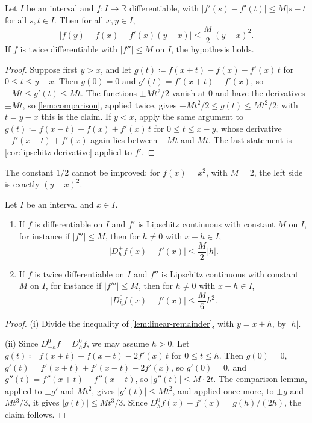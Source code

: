 \begin{lemma}
\label{lem:linear-remainder}
Let $I$ be an interval and $f\colon I\to\mathbb R$ differentiable, with $|f'(s)-f'(t)|\le M|s-t|$ for all $s,t\in I$. Then for all $x,y\in I$,
\[
\bigl|f(y)-f(x)-f'(x)(y-x)\bigr|\le\frac M2\,(y-x)^2 .
\]
If $f$ is twice differentiable with $|f''|\le M$ on $I$, the hypothesis holds.
\end{lemma}

\begin{proof}
Suppose first $y>x$, and let $g(t)\coloneqq f(x+t)-f(x)-f'(x)\,t$ for $0\le t\le y-x$. Then $g(0)=0$ and $g'(t)=f'(x+t)-f'(x)$, so $-Mt\le g'(t)\le Mt$. The functions $\pm Mt^2/2$ vanish at $0$ and have the derivatives $\pm Mt$, so \cref{lem:comparison}, applied twice, gives $-Mt^2/2\le g(t)\le Mt^2/2$; with $t=y-x$ this is the claim. If $y<x$, apply the same argument to $g(t)\coloneqq f(x-t)-f(x)+f'(x)\,t$ for $0\le t\le x-y$, whose derivative $-f'(x-t)+f'(x)$ again lies between $-Mt$ and $Mt$. The last statement is \cref{cor:lipschitz-derivative} applied to $f'$.
\end{proof}

The constant $1/2$ cannot be improved: for $f(x)=x^2$, with $M=2$, the left side is exactly $(y-x)^2$.

\begin{proposition}
\label{prop:difference-errors}
Let $I$ be an interval and $x\in I$.
\begin{enumerate}
\item If $f$ is differentiable on $I$ and $f'$ is Lipschitz continuous with constant $M$ on $I$, for instance if $|f''|\le M$, then for $h\ne0$ with $x+h\in I$,
\[
\bigl|D_h^+f(x)-f'(x)\bigr|\le\frac M2|h| .
\]
\item If $f$ is twice differentiable on $I$ and $f''$ is Lipschitz continuous with constant $M$ on $I$, for instance if $|f'''|\le M$, then for $h\ne0$ with $x\pm h\in I$,
\[
\bigl|D_h^0f(x)-f'(x)\bigr|\le\frac M6h^2 .
\]
\end{enumerate}
\end{proposition}

\begin{proof}
(i) Divide the inequality of \cref{lem:linear-remainder}, with $y=x+h$, by $|h|$.

(ii) Since $D_{-h}^0f=D_h^0f$, we may assume $h>0$. Let $g(t)\coloneqq f(x+t)-f(x-t)-2f'(x)\,t$ for $0\le t\le h$. Then $g(0)=0$, $g'(t)=f'(x+t)+f'(x-t)-2f'(x)$, so $g'(0)=0$, and $g''(t)=f''(x+t)-f''(x-t)$, so $|g''(t)|\le M\cdot2t$. The comparison lemma, applied to $\pm g'$ and $Mt^2$, gives $|g'(t)|\le Mt^2$, and applied once more, to $\pm g$ and $Mt^3/3$, it gives $|g(t)|\le Mt^3/3$. Since $D_h^0f(x)-f'(x)=g(h)/(2h)$, the claim follows.
\end{proof}

